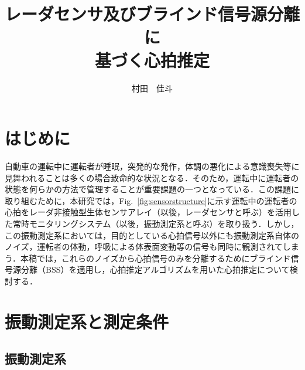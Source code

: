 \documentclass[a4j]{jsarticle}
\title{レーダセンサ及びブラインド信号源分離に\\基づく心拍推定}
\author{村田　佳斗}
\begin{document}
\maketitle%



\thispagestyle{empty}
\pagestyle{empty}

\section{はじめに}

自動車の運転中に運転者が睡眠，突発的な発作，体調の悪化による意識喪失等に見舞われることは多くの場合致命的な状況となる．そのため，運転中に運転者の状態を何らかの方法で管理することが重要課題の一つとなっている．この課題に取り組むために，本研究では，Fig.~\ref{fig:sensorstructure}に示す運転中の運転者の心拍をレーダ非接触型生体センサアレイ（以後，レーダセンサと呼ぶ）を活用した常時モニタリングシステム（以後，振動測定系と呼ぶ）を取り扱う．しかし，この振動測定系においては，目的としている心拍信号以外にも振動測定系自体のノイズ，運転者の体動，呼吸による体表面変動等の信号も同時に観測されてしまう．本稿では，これらのノイズから心拍信号のみを分離するためにブラインド信号源分離（BSS）を適用し，心拍推定アルゴリズムを用いた心拍推定について検討する．

\section{振動測定系と測定条件}

\subsection{振動測定系}
\end{document}
